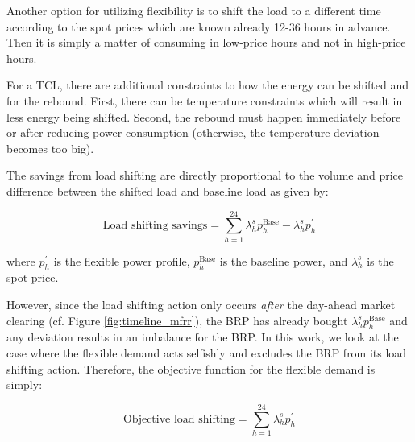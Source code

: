Another option for utilizing flexibility is to shift the load to a different time according to the spot prices which are known already 12-36 hours in advance. Then it is simply a matter of consuming in low-price hours and not in high-price hours.

For a TCL, there are additional constraints to how the energy can be shifted and for the rebound. First, there can be temperature constraints which will result in less energy being shifted. Second, the rebound must happen immediately before or after reducing power consumption (otherwise, the temperature deviation becomes too big).

The savings from load shifting are directly proportional to the volume and price difference between the shifted load and baseline load as given by:

\begin{equation}\label{eq:load_shifting_savings}
    \text{Load shifting savings} = \sum_{h=1}^{24} \lambda^{s}_{h} p^{\text{Base}}_{h} - \lambda^{s}_{h} p^{\prime}_{h}
\end{equation}

where $p^{\prime}_{h}$ is the flexible power profile, $p^{\text{Base}}_{h}$ is the baseline power, and $\lambda^{s}_{h}$ is the spot price.

However, since the load shifting action only occurs \textit{after} the day-ahead market clearing (cf. Figure \ref{fig:timeline_mfrr}), the BRP has already bought $\lambda^{s}_{h} p^{\text{Base}}_{h}$ and any deviation results in an imbalance for the BRP. In this work, we look at the case where the flexible demand acts selfishly and excludes the BRP from its load shifting action. Therefore, the objective function for the flexible demand is simply:

\begin{equation}\label{eq:LoadShiftingObjective}
    \text{Objective load shifting} = \sum_{h=1}^{24} \lambda_{h}^{s} p_{h}^{\prime}
\end{equation}
